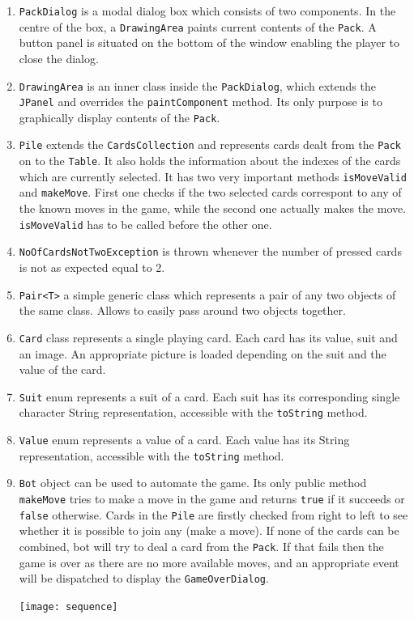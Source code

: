 \documentclass[a4paper, 11pt, titlepage]{article}
\begin{document}
\begin{enumerate}
	\item \texttt{PackDialog} is a modal dialog box which consists of two components. 
		In the centre of the box, a \texttt{DrawingArea} paints current contents of the
		\texttt{Pack}. A button panel is situated on the bottom of the window enabling
		the player to close the dialog.  
	
	\item \texttt{DrawingArea} is an inner class inside the \texttt{PackDialog}, which 
		extends the \texttt{JPanel} and overrides the \texttt{paintComponent} method. Its
		only purpose is to graphically display contents of the \texttt{Pack}.		
	
	\item \texttt{Pile} extends the \texttt{CardsCollection} and represents cards 
		dealt from the \texttt{Pack} on to the \texttt{Table}. It also holds the 
		information about the indexes of the cards which are currently selected. It has 
		two very important methods \texttt{isMoveValid} and \texttt{makeMove}. First one 
		checks if the two selected cards correspont to any of the known moves in the 
		game, while the second one actually makes the move. \texttt{isMoveValid} has to 
		be called before the other one. 

	\item \texttt{NoOfCardsNotTwoException} is thrown whenever the number of pressed 
		cards is not as expected equal to 2. 
	
	\item \texttt{Pair<T>} a simple generic class which represents a pair of any two 
		objects of the same class. Allows to easily pass around two objects together.

	\item \texttt{Card} class represents a single playing card. Each card has its value, 
		suit and an image. An appropriate picture is loaded depending on the suit and
		the value of the card. 
	
	\item \texttt{Suit} enum represents a suit of a card. Each suit has its corresponding
		single character String representation, accessible with the \texttt{toString} 
		method.
	
	\item \texttt{Value} enum represents a value of a card. Each value has its String 
		representation, accessible with the \texttt{toString} method.

	\item \texttt{Bot} object can be used to automate the game. Its only public method
		\texttt{makeMove} tries to make a move in the game and returns \texttt{true} if
		it succeeds or \texttt{false} otherwise. Cards in the \texttt{Pile} are firstly 
		checked from right to left to see whether it is possible to join any (make a 
		move). If none of the cards can be combined, bot will try to deal a card from 
		the \texttt{Pack}. If that fails then the game is over as there are no more
		available moves, and an appropriate event will be dispatched to display the
		\texttt{GameOverDialog}.
		
		\texttt{[image: sequence]}
	
\end{enumerate}
\end{document}
